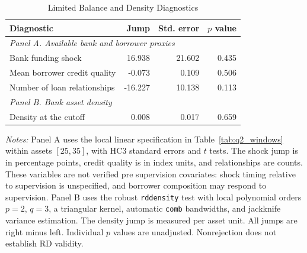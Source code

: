 \begin{table}[H]
\centering
\small
\caption{Limited Balance and Density Diagnostics}
\label{tab:q2_validity}
\begin{tabular*}{\textwidth}{@{\extracolsep{\fill}}lrrr}
\toprule
Diagnostic & Jump & Std. error & $p$ value \\
\midrule
\multicolumn{4}{l}{\textit{Panel A. Available bank and borrower proxies}} \\
Bank funding shock & 16.938 & 21.602 & 0.435 \\
Mean borrower credit quality & -0.073 & 0.109 & 0.506 \\
Number of loan relationships & -16.227 & 10.138 & 0.113 \\
\midrule
\multicolumn{4}{l}{\textit{Panel B. Bank asset density}} \\
Density at the cutoff & 0.008 & 0.017 & 0.659 \\
\bottomrule
\end{tabular*}
\begin{minipage}{\textwidth}\footnotesize
\textit{Notes:} Panel A uses the local linear specification in Table~\ref{tab:q2_windows} within assets $[25,35]$, with HC3 standard errors and $t$ tests. The shock jump is in percentage points, credit quality is in index units, and relationships are counts. These variables are not verified pre supervision covariates: shock timing relative to supervision is unspecified, and borrower composition may respond to supervision. Panel B uses the robust \texttt{rddensity} test with local polynomial orders $p=2$, $q=3$, a triangular kernel, automatic \texttt{comb} bandwidths, and jackknife variance estimation. The density jump is measured per asset unit. All jumps are right minus left. Individual $p$ values are unadjusted. Nonrejection does not establish RD validity.
\end{minipage}
\end{table}
